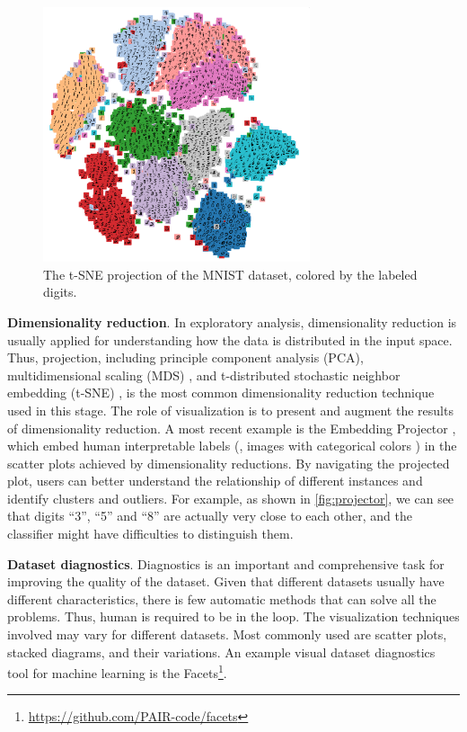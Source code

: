 \begin{figure}[hbt]
    \centering
    \includegraphics[width=0.7\textwidth]{figure/projector}
    \caption{The t-SNE projection of the MNIST dataset, colored by the labeled digits.}
    \label{fig:projector}
\end{figure}

\textbf{Dimensionality reduction}. In exploratory analysis, dimensionality reduction is usually applied for understanding how the data is distributed in the input space. Thus, projection, including principle component analysis (PCA), multidimensional scaling (MDS) \cite{kruskal1978mds}, and t-distributed stochastic neighbor embedding (t-SNE) \cite{maaten2008tsne}, is the most common dimensionality reduction technique used in this stage. The role of visualization is to present and augment the results of dimensionality reduction. A most recent example is the Embedding Projector \cite{smilkov2016projector}, which embed human interpretable labels (\eg, images with categorical colors ) in the scatter plots achieved by dimensionality reductions. By navigating the projected plot, users can better understand the relationship of different instances and identify clusters and outliers. For example, as shown in \autoref{fig:projector}, we can see that digits ``3'', ``5'' and ``8'' are actually very close to each other, and the classifier might have difficulties to distinguish them.

\textbf{Dataset diagnostics}. Diagnostics is an important and comprehensive task for improving the quality of the dataset. Given that different datasets usually have different characteristics, there is few automatic methods that can solve all the problems. Thus, human is required to be in the loop. The visualization techniques involved may vary for different datasets. Most commonly used are scatter plots, stacked diagrams, and their variations. An example visual dataset diagnostics tool for machine learning is the Facets\footnote{\url{https://github.com/PAIR-code/facets}}.

